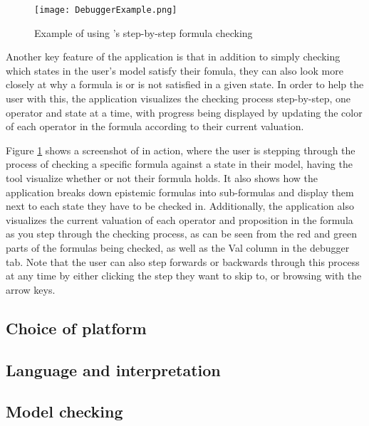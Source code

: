\begin{figure}[h]
	\label{fig:debugExmpl}
	\caption{Example of using \cname's step-by-step formula checking}
	\texttt{[image: DebuggerExample.png]}
\end{figure}


Another key feature of the application is that in addition to simply checking which states in the user's model satisfy their fomula, they can also look more closely at why a formula is or is not satisfied in a given state. In order to help the user with this, the application visualizes the checking process step-by-step, one operator and state at a time, with progress being displayed by updating the color of each operator in the formula according to their current valuation.


Figure \ref{fig:debugExmpl} shows a screenshot of \cname in action, where the user is stepping through the process of checking a specific formula against a state in their model, having the tool visualize whether or not their formula holds. It also shows how the application breaks down epistemic formulas into sub-formulas and display them next to each state they have to be checked in. Additionally, the application also visualizes the current valuation of each operator and proposition in the formula as you step through the checking process, as can be seen from the red and green parts of the formulas being checked, as well as the Val column in the debugger tab. Note that the user can also step forwards or backwards through this process at any time by either clicking the step they want to skip to, or browsing with the arrow keys. 


\subsection{Choice of platform}

\subsection{Language and interpretation}

\subsection{Model checking}



